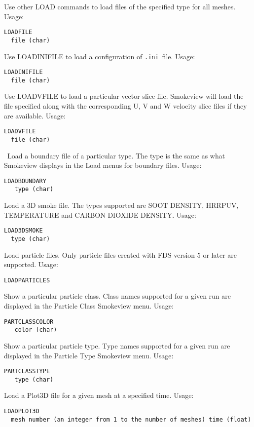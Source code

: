 \documentclass[11pt,twoside]{book}
\newcommand{\hitem}[1]{\item[{\bf #1} \hfill]}
\begin{document}
Use other LOAD commands to load files of the specified type for all meshes.
Usage:
\begin{lstlisting}
LOADFILE
  file (char)
\end{lstlisting}

\hitem{LOADINIFILE}
Use LOADINIFILE to load a configuration of {\tt .ini}\ file.
Usage:
\begin{lstlisting}
LOADINIFILE
  file (char)
\end{lstlisting}

\hitem{LOADVFILE}
Use LOADVFILE to load a particular vector slice file.  Smokeview will load the file
specified along with the corresponding U, V and W velocity slice files if they are available.
Usage:
\begin{lstlisting}
LOADVFILE
  file (char)
\end{lstlisting}

\hitem{LOADBOUNDARY}\ Load a boundary file of a particular type.
The type is the same as what Smokeview displays in the Load menus for boundary files.
Usage:
\begin{lstlisting}
LOADBOUNDARY
   type (char)
\end{lstlisting}

\hitem{LOAD3DSMOKE}
Load a 3D smoke file.  The types supported are
SOOT DENSITY, HRRPUV,\\
TEMPERATURE and CARBON DIOXIDE DENSITY.
Usage:
\begin{lstlisting}
LOAD3DSMOKE
  type (char)
\end{lstlisting}

\hitem{LOADPARTICLES}Load particle files.  Only particle files created with FDS version 5 or
later are supported.
Usage:
\begin{lstlisting}
LOADPARTICLES
\end{lstlisting}

\hitem{PARTCLASSCOLOR}Show a particular particle class.  Class names supported for a given
run are displayed in the Particle Class Smokeview menu.
Usage:
\begin{lstlisting}
PARTCLASSCOLOR
   color (char)
\end{lstlisting}

\hitem{PARTCLASSTYPE}Show a particular particle type.  Type names supported for a given
run are displayed in the Particle Type Smokeview menu.
Usage:
\begin{lstlisting}
PARTCLASSTYPE
   type (char)
\end{lstlisting}

\hitem{LOADPLOT3D}Load a Plot3D file for a given mesh at a specified time.
Usage:
\begin{lstlisting}
LOADPLOT3D
  mesh number (an integer from 1 to the number of meshes) time (float)
\end{lstlisting}
\end{document}
